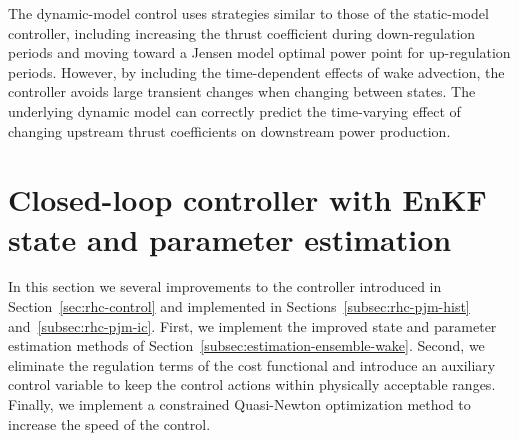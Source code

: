 The dynamic-model control uses strategies similar to those of the static-model controller, including increasing the thrust coefficient during down-regulation periods and moving toward a Jensen model optimal power point for up-regulation periods. However, by including the time-dependent effects of wake advection, the controller avoids large transient changes when changing between states. The underlying dynamic model can correctly predict the time-varying effect of changing upstream thrust coefficients on downstream power production.

\section{Closed-loop controller with EnKF state and parameter estimation}
\label{sec:rhc-enkf}
In this section we several improvements to the controller introduced in Section~\ref{sec:rhc-control} and implemented in Sections~\ref{subsec:rhc-pjm-hist} and~\ref{subsec:rhc-pjm-ic}. First, we implement the improved state and parameter estimation methods of Section~\ref{subsec:estimation-ensemble-wake}. Second, we eliminate the regulation terms of the cost functional and introduce an auxiliary control variable to keep the control actions within physically acceptable ranges. Finally, we implement a constrained Quasi-Newton optimization method to increase the speed of the control.

